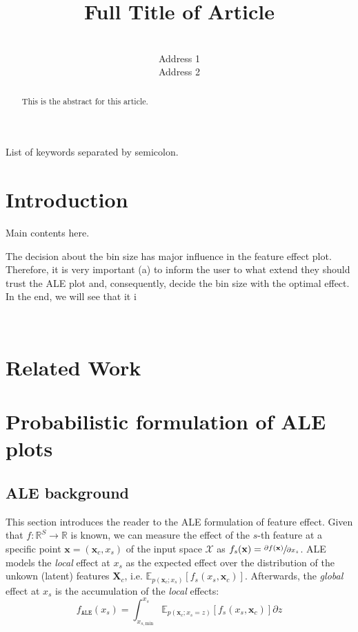 \documentclass[wcp]{jmlr}
\title[Short Title]{Full Title of Article}
\author{\Name{Author Name1} \Email{abc@sample.com}\\
  \addr Address 1
  \AND
  \Name{Author Name2} \Email{xyz@sample.com}\\
  \addr Address 2
 }
\newcommand{\xc}{\mathbf{x}_c}
\newcommand{\Xc}{\mathbf{X}_c}
\newcommand{\x}{\mathbf{x}}
\newcommand{\E}{\mathbb{E}}
\newcommand{\R}{\mathbb{R}}
\newcommand{\1}{\mathbbm{1}}
\begin{document}
\maketitle

\begin{abstract}
This is the abstract for this article.
\end{abstract}
\begin{keywords}
List of keywords separated by semicolon.
\end{keywords}

\section{Introduction}
Main contents here.

The decision about the bin size has major influence in the feature
effect plot. Therefore, it is very important (a) to inform the user to
what extend they should trust the ALE plot and, consequently, decide
the bin size with the optimal effect. In the end, we will see that it i

\newpage
~\newpage

\section{Related Work}

\newpage

\section{Probabilistic formulation of ALE plots}

\subsection{ALE background}\label{sec:ALE}

This section introduces the reader to the ALE formulation of feature
effect. Given that \(f: \R^S \rightarrow \R \) is known, we can
measure the effect of the \(s\)-th feature at a specific point
\( \x = (\xc, x_s)\) of the input space \(\mathcal{X}\) as
\(f_s(\x) = \sfrac{\partial f(\x)}{\partial x_s}\). ALE models the
\textit{local} effect at \(x_s\) as the expected effect over the
distribution of the unkown (latent) features \(\Xc\), i.e.
\(\E_{p(\xc;x_s)}[f_s(x_s, \xc)]\). Afterwards, the \textit{global}
effect at \(x_s\) is the accumulation of the \textit{local} effects:
%
\begin{equation}
  \label{eq:ale-definition}
  f_{\mathtt{ALE}}(x_s) =
  \int_{x_{s, \text{min}}}^{x_s} \E_{p(\xc;x_s=z)}[f_s(x_s, \xc)] \partial z
\end{equation}
\end{document}
